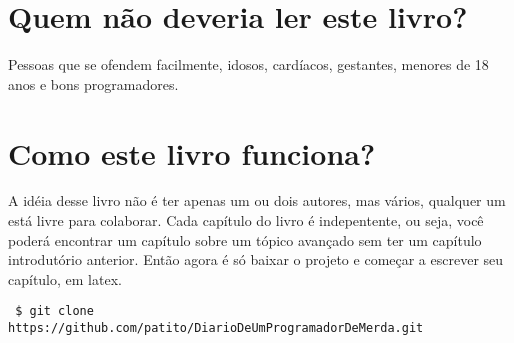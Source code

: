 \section{Quem não deveria ler este livro?}

Pessoas que se ofendem facilmente, idosos, cardíacos, gestantes, menores de 18 anos e bons programadores.

\section{Como este livro funciona?}

A idéia desse livro não é ter apenas um ou dois autores, mas vários, qualquer um está livre para colaborar. Cada capítulo do livro 
é indepentente, ou seja, você poderá encontrar um capítulo sobre um tópico avançado sem ter um capítulo introdutório anterior. 
Então agora é só baixar o projeto e começar a escrever seu capítulo, em latex.

\begin{verbatim}
 $ git clone https://github.com/patito/DiarioDeUmProgramadorDeMerda.git
\end{verbatim}




